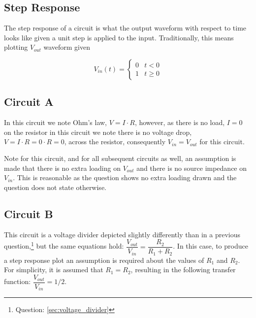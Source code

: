 \documentclass[main.tex]{subfiles}
\begin{document}
\subsection{Step Response}
The step response of a circuit is what the output waveform with respect to time looks like given a unit step is applied to the input. Traditionally, this means plotting $V_{out}$ waveform given 

\[ V_{in}(t) = \begin{cases} 0 & t < 0 \\ 1 & t \geq 0 \end{cases} \]


\subsection{Circuit A}
In this circuit we note Ohm's law, $V = I \cdot R$, however, as there is no load, $I=0$ on the resistor in this circuit we note there is no voltage drop, $V=I \cdot R=0 \cdot R=0$, across the resistor, consequently $V_{in} = V_{out}$ for this circuit. \newline

\newnoindentpara Note for this circuit, and for all subsequent circuits as well, an assumption is made that there is no extra loading on $V_{out}$ and there is no source impedance on $V_{in}$. This is reasonable as the question shows no extra loading drawn and the question does not state otherwise.

\subsection{Circuit B}
This circuit is a voltage divider depicted slightly differently than in a previous question,\footnote{Question: \ref{sec:voltage_divider}} but the same equations hold: $\dfrac{V_{out}}{V_{in}} = \dfrac{R_2}{R_1 + R_2}$. In this case, to produce a step response plot an assumption is required about the values of $R_1$ and $R_2$. For simplicity, it is assumed that $R_1 = R_2$, resulting in the following transfer function: $\dfrac{V_{out}}{V_{in}} = 1/2$.
\end{document}
